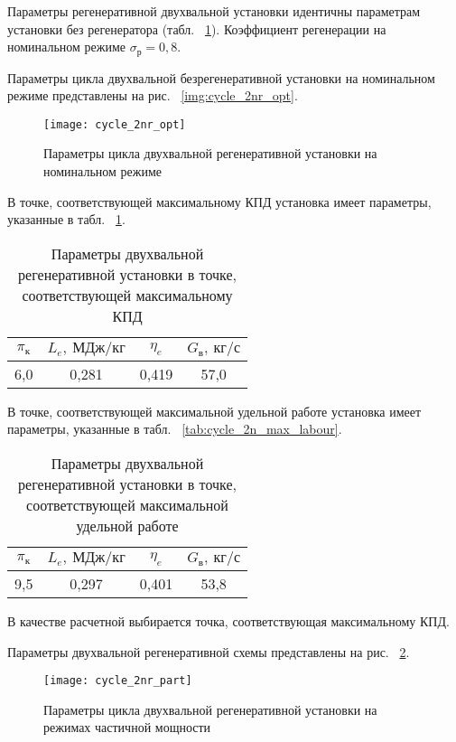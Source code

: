 Параметры регенеративной двухвальной установки идентичны параметрам установки без регенератора (табл. ~\ref{img:cycle_2n_opt}). Коэффициент регенерации на номинальном режиме $\sigma_р = 0,8$.

Параметры цикла двухвальной безрегенеративной установки на номинальном режиме представлены на рис. ~\ref{img:cycle_2nr_opt}.

\begin{figure}[H]
    \centering
    \texttt{[image: cycle\_2nr\_opt]}
    \caption{Параметры цикла двухвальной регенеративной установки на номинальном режиме}
    \label{img:cycle_2n_opt}
\end{figure}

В точке, соответствующей максимальному КПД установка имеет параметры, указанные в табл. ~\ref{tab:cycle_2nr_max_eta}.

\begin{longtable}{|c|c|c|c|}
	\caption{Параметры двухвальной регенеративной установки в точке, соответствующей максимальному КПД} 
	\label{tab:cycle_2nr_max_eta}
	\hline
	\textbf{$\pi_к$} & \textbf{$L_e, \ МДж/кг$} & \textbf{$\eta_e$} & \textbf{$G_в, \ кг/с$} \\ \hline
	6,0 & 0,281 & 0,419 & 57,0 \\ \hline
\end{longtable}


В точке, соответствующей максимальной удельной работе установка имеет параметры, указанные в табл. ~\ref{tab:cycle_2n_max_labour}.
\begin{longtable}{|c|c|c|c|}
	\caption{Параметры двухвальной регенеративной установки в точке, соответствующей максимальной удельной работе} 
	\label{tab:cycle_2nr_max_labour}
	\hline
	\textbf{$\pi_к$} & \textbf{$L_e, \ МДж/кг$} & \textbf{$\eta_e$} & \textbf{$G_в, \ кг/с$} \\ \hline
	9,5 & 0,297 & 0,401 & 53,8 \\ \hline
\end{longtable}

В качестве расчетной выбирается точка, соответствующая максимальному КПД.

Параметры двухвальной регенеративной схемы представлены на рис. ~\ref{img:cycle_2nr_part}.

\begin{figure}[H]
    \centering
    \texttt{[image: cycle\_2nr\_part]}
    \caption{Параметры цикла двухвальной регенеративной установки на режимах частичной мощности}
    \label{img:cycle_2nr_part}
\end{figure}

